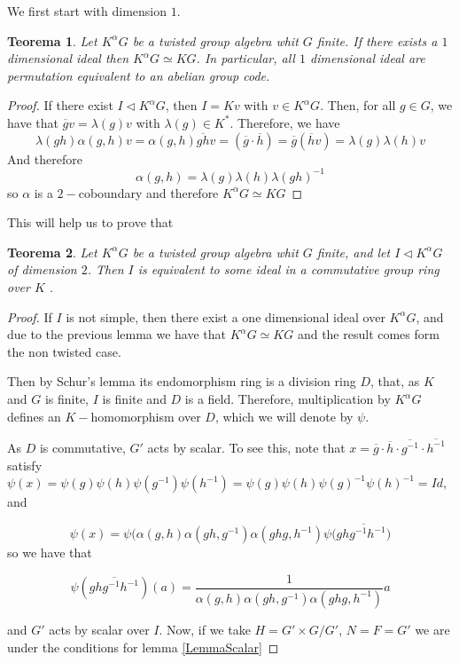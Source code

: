 \documentclass{article}
\newtheorem{theorem}{Teorema}
\begin{document}
We first start with dimension $1$.
\begin{theorem}
    Let $K^\alpha G$ be a twisted group algebra whit $G$ finite. If there exists a $1$ dimensional ideal then $K^\alpha G \simeq K G$. In particular, all $1$ dimensional ideal are permutation equivalent to an abelian group code.
\end{theorem}
\begin{proof}
    If there exist $I\triangleleft K^\alpha G $, then $I= Kv$ with $v\in K^\alpha G$. Then, for all $g\in G$, we have that $\overline{g} v = \lambda(g) v$ with $\lambda(g) \in K^*$. Therefore, we have
    \begin{equation}
        \lambda(gh) \alpha(g,h)v  =  \alpha(g,h) \overline{ gh} v = (\overline{g} \cdot \overline{h} ) =\overline{g} ( \overline{h} v) = \lambda(g) \lambda(h) v
    \end{equation}
    And therefore 
    \begin{equation}
        \alpha(g,h) = \lambda(g) \lambda(h) \lambda(gh)^{-1}
    \end{equation}
    so $\alpha $ is a $2-$coboundary and therefore $K^\alpha G \simeq K G$
\end{proof}

This will help us to prove that
\begin{theorem}
    Let $K^\alpha G$ be a twisted group algebra whit $G$ finite, and let $I\triangleleft K^\alpha G$ of dimension $2$. Then $I$ is equivalent to some ideal in a commutative group ring
over $K$ .
\end{theorem}
\begin{proof}
    If $I$ is not simple, then there exist a one dimensional ideal over $K^\alpha G$, and due to the previous lemma we have that $K^\alpha G \simeq KG$ and the result comes form the non twisted case.  
    
    Then by Schur's lemma  its endomorphism ring is a division ring $D$, that, as $K$ and $G$ is finite, $I$ is finite and $D$ is a field. Therefore, multiplication by $K^\alpha G$ defines an $K-$homomorphism over $D$, which we will denote by $\psi$. 
    
    As $D$ is commutative,  $G'$ acts by scalar. To see this, note that $x=\overline{g} \cdot \overline{h} \cdot \overline{g^{-1}} \cdot \overline{h^{-1}}$ satisfy $\psi(x) = \psi(g) \psi(h) \psi(g^{-1}) \psi(h^{-1}) = \psi(g) \psi(h) \psi(g) ^{-1} \psi(h)^{-1} = Id$, and 
    
    \[\psi(x) = \psi( \alpha(g,h)\alpha(gh,g^{-1})\alpha(ghg,h^{-1})\psi ( \overline{ghg^{-1}h^{-1})}\]
    so we have that
    
    \[\psi\left(\overline{ghg^{-1}h^{-1}}\right) ( a) = \frac{1}{\alpha(g,h)\alpha(gh,g^{-1})\alpha(ghg,h^{-1})} a\] 
    
    and $G'$ acts by scalar over $I$. Now, if we take $H=G' \times G/G'$, $N=F=G'$ we are under the conditions for lemma \ref{LemmaScalar} 

\end{proof}
\end{document}
